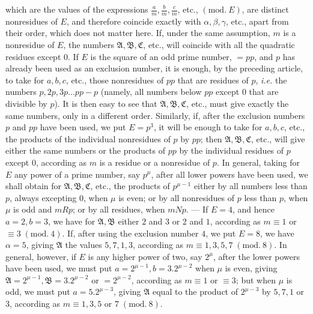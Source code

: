 which are the values of the expressions \(\frac am,\allowbreak \frac bm,\allowbreak \frac cm\), etc., \((\mathrm{mod.}\ E)\), are distinct nonresidues of \(E\), and therefore coincide exactly with \(\alpha,\allowbreak \beta,\allowbreak \gamma\), etc., apart from their order, which does not matter here. If, under the same assumption, \(m\) is a nonresidue of \(E\), the numbers \(\mathfrak A,\allowbreak \mathfrak B,\allowbreak \mathfrak C\), etc., will coincide with all the quadratic residues except \(0\). If \(E\) is the square of an odd prime number, \(=pp\), and \(p\) has already been used as an exclusion number, it is enough, by the preceding article, to take for \(a,\allowbreak b,\allowbreak c\), etc., those nonresidues of \(pp\) that are residues of \(p\), \textit{i.e.} the numbers \(p,\allowbreak 2p,\allowbreak 3p\ldots pp-p\) (namely, all numbers below \(pp\) except \(0\) that are divisible by \(p\)). It is then easy to see that \(\mathfrak A,\allowbreak \mathfrak B,\allowbreak \mathfrak C\), etc., must give exactly the same numbers, only in a different order. Similarly, if, after the exclusion numbers \(p\) and \(pp\) have been used, we put \(E=p^3\), it will be enough to take for \(a,\allowbreak b,\allowbreak c\), etc., the products of the individual nonresidues of \(p\) by \(pp\); then \(\mathfrak A,\allowbreak \mathfrak B,\allowbreak \mathfrak C\), etc., will give either the same numbers or the products of \(pp\) by the individual residues of \(p\) except \(0\), according as \(m\) is a residue or a nonresidue of \(p\). In general, taking for \(E\) any power of a prime number, say \(p^\mu\), after all lower powers have been used, we shall obtain for \(\mathfrak A,\allowbreak \mathfrak B,\allowbreak \mathfrak C\), etc., the products of \(p^{\mu-1}\) either by all numbers less than \(p\), always excepting \(0\), when \(\mu\) is even; or by all nonresidues of \(p\) less than \(p\), when \(\mu\) is odd and \(mRp\); or by all residues, when \(mNp\). — If \(E=4\), and hence \(a=2,\allowbreak b=3\), we have for \(\mathfrak A,\allowbreak \mathfrak B\) either \(2\) and \(3\) or \(2\) and \(1\), according as \(m\equiv1\) or \(\equiv3\; (\mathrm{mod}.\ 4)\). If, after using the exclusion number \(4\), we put \(E=8\), we have \(\alpha=5\), giving \(\mathfrak A\) the values \(5,\allowbreak 7,\allowbreak 1,\allowbreak 3\), according as \(m\equiv1,\allowbreak 3,\allowbreak 5,\allowbreak 7\; (\mathrm{mod}.\ 8)\). In general, however, if \(E\) is any higher power of two, say \(2^\mu\), after the lower powers have been used, we must put \(a=2^{\mu-1},\allowbreak b=3.2^{\mu-2}\) when \(\mu\) is even, giving \(\mathfrak A=2^{\mu-1},\allowbreak \mathfrak B=3.2^{\mu-2}\) or \(=2^{\mu-2}\), according as \(m\equiv1\) or \(\equiv3\); but when \(\mu\) is odd, we must put \(a=5.2^{\mu-3}\), giving \(\mathfrak A\) equal to the product of \(2^{\mu-3}\) by \(5,\allowbreak 7,\allowbreak 1\) or \(3\), according as \(m\equiv1,\allowbreak 3,\allowbreak 5\) or \(7\; (\mathrm{mod}.\ 8)\).

